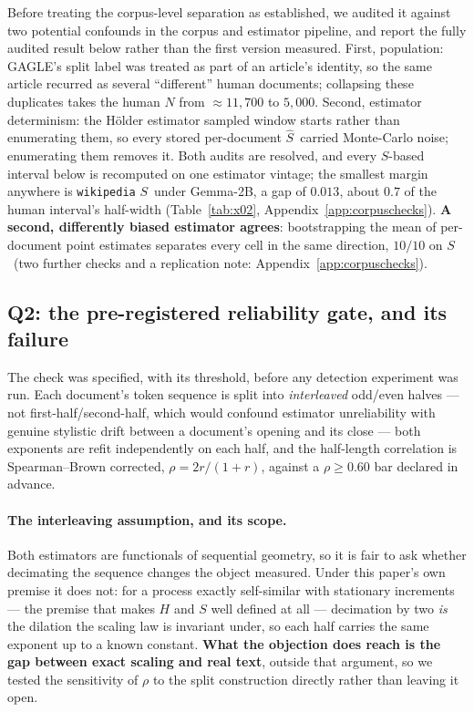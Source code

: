 \documentclass{article}
\newcommand{\Sest}{\ensuremath{\widehat{S}}}
\newcommand{\Strue}{\ensuremath{S}}
\newcommand{\Htrue}{\ensuremath{H}}
\begin{document}
Before treating the corpus-level separation as established, we audited it
against two potential confounds in the corpus and estimator pipeline, and
report the fully audited result below rather than the first version measured.
First, population: GAGLE's split label was treated as part of an article's
identity, so the same article recurred as several ``different'' human
documents; collapsing these duplicates takes the human $N$ from
$\approx11{,}700$ to $5{,}000$. Second, estimator determinism: the H\"older
estimator sampled window starts rather than enumerating them, so every stored
per-document \Sest\ carried Monte-Carlo noise; enumerating them removes it.
Both audits are resolved, and every $S$-based interval below is recomputed
on one estimator vintage; the smallest margin anywhere is \texttt{wikipedia}
\Strue\ under Gemma-2B, a gap of $0.013$, about $0.7$ of the human interval's
half-width (Table~\ref{tab:x02}, Appendix~\ref{app:corpuschecks}). \textbf{A second,
differently biased estimator agrees}: bootstrapping the mean of per-document
point estimates separates every cell in the same direction, $10/10$ on
\Strue\ (two further checks and a replication note: Appendix~\ref{app:corpuschecks}).

\subsection{Q2: the pre-registered reliability gate, and its failure}
\label{sec:reliability}

The check was specified, with its threshold, before any detection experiment was
run. Each document's token sequence is split into \emph{interleaved} odd/even
halves --- not first-half/second-half, which would confound estimator unreliability
with genuine stylistic drift between a document's opening and its close --- both
exponents are refit independently on each half, and the half-length correlation is
Spearman--Brown corrected, $\rho = 2r/(1+r)$, against a $\rho\ge0.60$ bar declared
in advance.

\paragraph{The interleaving assumption, and its scope.} Both estimators are
functionals of sequential geometry, so it is fair to ask whether decimating
the sequence changes the object measured. Under this paper's own premise it
does not: for a process exactly self-similar with stationary increments ---
the premise that makes $\Htrue$ and $\Strue$ well defined at all --- decimation
by two \emph{is} the dilation the scaling law is invariant under, so each half
carries the same exponent up to a known constant. \textbf{What the objection
does reach is the gap between exact scaling and real text}, outside that
argument, so we tested the sensitivity of $\rho$ to the split construction
directly rather than leaving it open.
\end{document}
